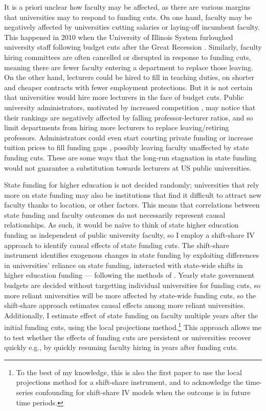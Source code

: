 It is a priori unclear how faculty may be affected, as there are various margins that universities may to respond to funding cuts.
On one hand, faculty may be negatively affected by universities cutting salaries or laying-off incumbent faculty.
This happened in 2010 when the University of Illinois System furloughed university staff following budget cuts after the Great Recession \citep{furlough2010}.
Similarly, faculty hiring committees are often cancelled or disrupted in response to funding cuts, meaning there are fewer faculty entering a department to replace those leaving.
On the other hand, lecturers could be hired to fill in teaching duties, on shorter and cheaper contracts with fewer employment protections.
But it is not certain that universities would hire more lecturers in the face of budget cuts.
Public university administrators, motivated by increased competition \citep{hoxby2009changing,urquiola2020markets}, may notice that their rankings are negatively affected by falling professor-lecturer ratios, and so limit departments from hiring more lecturers to replace leaving/retiring professors.
Administrators could even start courting private funding or increase tuition prices to fill funding gaps \citep{bound2019public}, possibly leaving faculty unaffected by state funding cuts.
These are some ways that the long-run stagnation in state funding would not guarantee a substitution towards lecturers at US public universities.

State funding for higher education is not decided randomly;
universities that rely more on state funding may also be institutions that find it difficult to attract new faculty thanks to location, or other factors.
This means that correlations between state funding and faculty outcomes do not necessarily represent causal relationships.
As such, it would be na\"ive to think of state higher education funding as independent of public university faculty, so I employ a shift-share IV approach to identify causal effects of state funding cuts.
The shift-share instrument identifies exogenous changes in state funding by exploiting differences in universities' reliance on state funding, interacted with state-wide shifts in higher education funding --- following the methods of \cite{NBERw23736,NBERw27885}.
Yearly state government budgets are decided without targetting individual universities for funding cuts, so more reliant universities will be more affected by state-wide funding cuts, so the shift-share approach estimates causal effects among more reliant universities.
Additionally, I estimate effect of state funding on faculty multiple years after the initial funding cuts, using the local projections method.\footnote{
    To the best of my knowledge, this is also the first paper to use the local projections method for a shift-share instrument, and to acknowledge the time-series confounding for shift-share IV models when the outcome is in future time periods.
}
This approach allows me to test whether the effects of funding cuts are persistent or universities recover quickly e.g., by quickly resuming faculty hiring in years after funding cuts.

